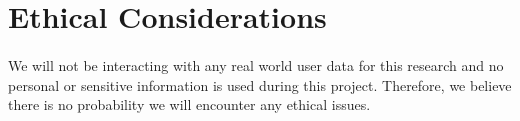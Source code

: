 \section{Ethical Considerations}
\paragraph{}
We will not be interacting with any real world user data for this research and no personal or sensitive information is used during this project.
Therefore, we believe there is no probability we will encounter any ethical issues.